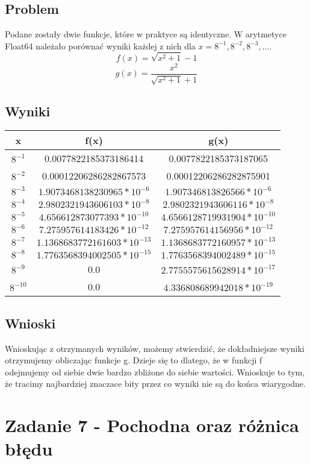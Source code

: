 \documentclass[12pt, a4paper]{article}
\begin{document}
\subsection{Problem}
Podane zostały dwie funkcje, które w praktyce są identyczne. W arytmetyce Float64 należało porównać wyniki każdej z nich dla $x = 8^{-1}, 8^{-2}, 8^{-3},...$.
\[ f(x) = \sqrt{x^2 + 1} - 1 \]
\[ g(x) = \frac{x^2}{\sqrt{x^2 + 1} + 1} \]
\subsection{Wyniki}
\begin{center}
  \begin{tabular}{c|c|c}
    x & f(x) & g(x)\\
    \hline
    $8^{-1}$ & 0.0077822185373186414 & 0.0077822185373187065 \\
    $8^{-2}$ & 0.00012206286282867573 & 0.00012206286282875901 \\
    $8^{-3}$ & $1.9073468138230965 * 10^{-6}$ & $1.907346813826566 * 10^{-6}$ \\
    $8^{-4}$ & $2.9802321943606103 * 10^{-8}$ & $2.9802321943606116 * 10^{-8}$ \\
    $8^{-5}$ & $4.656612873077393 * 10^{-10}$ & $4.6566128719931904 * 10^{-10}$ \\
    $8^{-6}$ & $7.275957614183426 * 10^{-12}$ & $7.275957614156956 * 10^{-12}$ \\
    $8^{-7}$ & $1.1368683772161603 * 10^{-13}$ & $1.1368683772160957 * 10^{-13}$\\
    $8^{-8}$ & $1.7763568394002505 * 10^{-15}$ & $1.7763568394002489 * 10^{-15}$\\
    $8^{-9}$ & 0.0 & $2.7755575615628914 * 10^{-17}$\\
    $8^{-10}$ & 0.0 & $4.336808689942018 * 10^{-19}$
  \end{tabular}
\end{center}
\subsection{Wnioski}
Wnioskując z otrzymanych wyników, możemy stwierdzić, że dokładniejsze wyniki otrzymujemy obliczając funkcje g. Dzieje się to dlatego, że w funkcji f odejmujemy od siebie dwie bardzo zbliżone do siebie wartości. Wnioskuje to tym, że tracimy najbardziej znaczace bity przez co wyniki nie są do końca wiarygodne.

\section{Zadanie 7 - Pochodna oraz różnica błędu}
\end{document}
